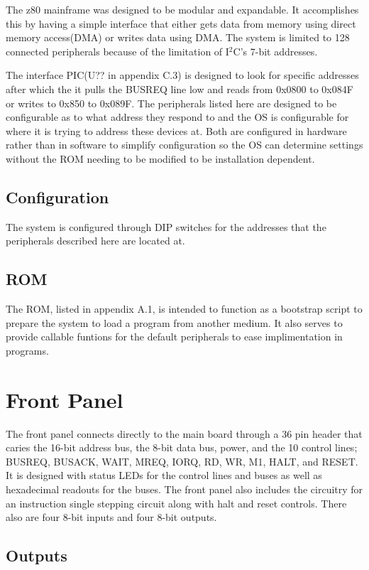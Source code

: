 \documentclass{book}
\begin{document}
The z80 mainframe was designed to be modular and expandable. It accomplishes this by having a simple interface that either gets data from memory using direct memory access(DMA) or writes data using DMA. The system is limited to 128 connected peripherals because of the limitation of I$^2$C's 7-bit addresses.

The interface PIC(U?? in appendix C.3)  is designed to look for specific addresses after which the it pulls the BUSREQ line low and reads from 0x0800 to 0x084F or writes to 0x850 to 0x089F. The peripherals listed here are designed to be configurable as to what address they respond to and the OS is configurable for where it is trying to address these devices at. Both are configured in hardware rather than in software to simplify configuration so the OS can determine settings without the ROM needing to be modified to be installation dependent.

\section{Configuration}
The system is configured through DIP switches for the addresses that the peripherals described here are located at.

\section{ROM}
The ROM, listed in appendix A.1, is intended to function as a bootstrap script to prepare the system to load a program from another medium. It also serves to provide callable funtions for the default peripherals to ease implimentation in programs.

\chapter{Front Panel}
The front panel connects directly to the main board through a 36 pin header that caries the 16-bit address bus, the 8-bit data bus, power, and the 10 
control lines; BUSREQ, BUSACK, WAIT, MREQ, IORQ, RD, WR, M1, HALT, and RESET. It is designed with status LEDs for the control lines and buses as well 
as hexadecimal readouts for the buses. The front panel also includes the circuitry for an instruction single stepping circuit along with halt and reset 
controls. There also are four 8-bit inputs and four 8-bit outputs.
\section{Outputs}
\end{document}
